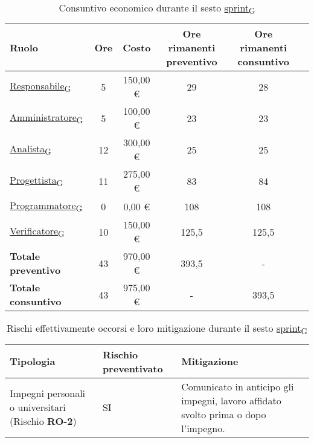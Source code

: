 \begin{table}[!h]
    \centering
    \begin{tabular}{ | l | c | c | c | c | c | }
        \hline
        \textbf{Ruolo} & \textbf{Ore} & \textbf{Costo} & \textbf{Ore rimanenti preventivo} & \textbf{Ore rimanenti consuntivo} \\
        \hline
        \href{https://7last.github.io/docs/pb/documentazione-interna/glossario\#responsabile}{Responsabile\textsubscript{G}}			&  5   &    150,00 € &   29   &   28   \\
        \href{https://7last.github.io/docs/pb/documentazione-interna/glossario\#amministratore}{Amministratore\textsubscript{G}}		&  5   &    100,00 € &   23   &   23   \\
        \href{https://7last.github.io/docs/pb/documentazione-interna/glossario\#analista}{Analista\textsubscript{G}}                   &  12   &    300,00 € &   25   &   25   \\
        \href{https://7last.github.io/docs/pb/documentazione-interna/glossario\#progettista}{Progettista\textsubscript{G}}                										  &  11   &    275,00 € &   83   &   84   \\
        \href{https://7last.github.io/docs/pb/documentazione-interna/glossario\#programmatore}{Programmatore\textsubscript{G}}              										  &  0   &    0,00 € &   108   &   108   \\
        \href{https://7last.github.io/docs/pb/documentazione-interna/glossario\#verificatore}{Verificatore\textsubscript{G}}               &  10   &    150,00 € &   125,5   &   125,5   \\
        \hline
        \textbf{Totale preventivo} &  43   &    970,00 € &   393,5   &   -   \\
        \hline
        \textbf{Totale consuntivo} &  43   &    975,00 € &   -   &   393,5   \\
        \hline
    \end{tabular}
    \caption{Consuntivo economico durante il sesto \href{https://7last.github.io/docs/pb/documentazione-interna/glossario\#sprint}{sprint\textsubscript{G}}}

\end{table}
\newpage
{}
\begin{table}[!h]
    \centering
    \begin{tabular}{ | p{6cm} | p{2.5cm} | p{7.5cm} | }
        \hline
        \textbf{Tipologia} & \textbf{Rischio preventivato} & \textbf{Mitigazione}  \\
        \hline
        Impegni personali o universitari (Rischio \textbf{RO-2})& SI & Comunicato in anticipo gli impegni, lavoro affidato svolto prima o dopo l’impegno. \\
        \hline
    \end{tabular}
    \caption{Rischi effettivamente occorsi e loro mitigazione durante il sesto \href{https://7last.github.io/docs/pb/documentazione-interna/glossario\#sprint}{sprint\textsubscript{G}}}
\end{table}

